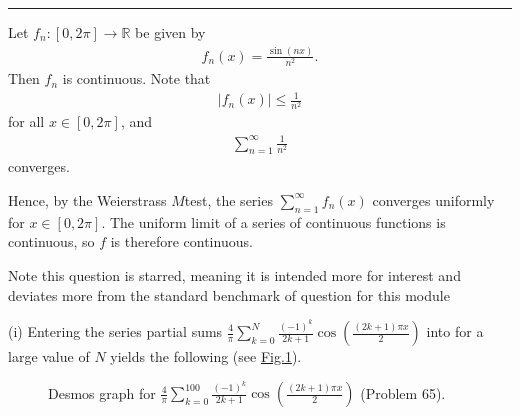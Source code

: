 \documentclass[letterpaper,10pt,english]{jupyterBook}
\let\sphinxpxdimen\pdfpxdimen\else\newdimen\sphinxpxdimen
\begin{document}
\bigskip\hrule\bigskip


\sphinxAtStartPar
{\hyperref[\detokenize{Problems:id64}]{}}
Let \(f_n:[0,2\pi]\to\mathbb{R}\) be given by
\begin{equation*}
\begin{split}
f_n (x) = \frac{\sin (nx )}{n^2}.
\end{split}
\end{equation*}
\sphinxAtStartPar
Then \(f_n\) is continuous. Note that
\begin{equation*}
\begin{split}
|f_n (x )| \leq  \frac{1}{n^2}
\end{split}
\end{equation*}
\sphinxAtStartPar
for all \(x \in [0,2\pi]\), and
\begin{equation*}
\begin{split}
\sum_{n=1}^\infty \frac{1}{n^2}
\end{split}
\end{equation*}
\sphinxAtStartPar
converges.

\sphinxAtStartPar
Hence, by the Weierstrass \(M\)\sphinxhyphen{}test, the series \(\sum_{n=1}^\infty f_n (x )\) converges uniformly for \(x \in [0,2\pi]\). The uniform limit of a series of continuous functions is continuous, so \(f\) is therefore continuous.

\label{\detokenize{Solutions-full:id3}}
\sphinxAtStartPar
{\hyperref[\detokenize{Problems:id65}]{}} Note this question is starred, meaning it is intended more for interest and deviates more from the standard benchmark of question for this module

\sphinxAtStartPar
(i) Entering the series partial sums \(\frac{4}{\pi}\sum_{k=0}^N\frac{(-1)^k}{2k+1}\cos\left(\frac{(2k+1)\pi x}{2}\right)\) into  for a large value of \(N\) yields the following (see \hyperref[\detokenize{Solutions-full:fourier1}]{Fig.\@ \ref{\detokenize{Solutions-full:fourier1}}}).

\begin{figure}[htbp]
\centering
\capstart

\noindent\sphinxincludegraphics[width=400\sphinxpxdimen]{{fourier1}.png}
\caption{Desmos graph for \(\frac{4}{\pi}\sum_{k=0}^100\frac{(-1)^k}{2k+1}\cos\left(\frac{(2k+1)\pi x}{2}\right)\) (Problem 65).}\label{\detokenize{Solutions-full:fourier1}}\end{figure}
\end{document}
